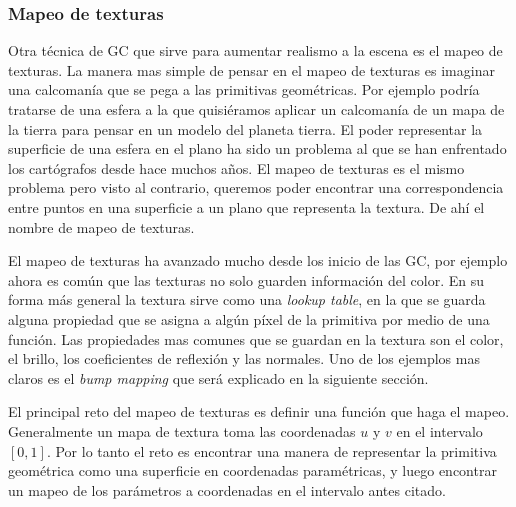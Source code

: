 \subsubsection{Mapeo de texturas}

Otra técnica de GC que sirve para aumentar realismo a la escena es el mapeo de texturas. La manera mas simple de pensar en el mapeo de texturas es imaginar una calcomanía que se pega a las primitivas geométricas. Por ejemplo podría tratarse de una esfera a la que quisiéramos aplicar un calcomanía de un mapa de la tierra para pensar en un modelo del planeta tierra. El poder representar la superficie de una esfera en el plano ha sido un problema al que se han enfrentado los cartógrafos desde hace muchos años. El mapeo de texturas es el mismo problema pero visto al contrario, queremos poder encontrar una correspondencia entre puntos en una superficie a un plano que representa la textura. De ahí el nombre de mapeo de texturas.

El mapeo de texturas ha avanzado mucho desde los inicio de las GC, por ejemplo ahora es común que las texturas no solo guarden información del color. En su forma más general la textura sirve como una \emph{lookup table}, en la que se guarda alguna propiedad que se asigna a algún píxel de la primitiva por medio de una función. Las propiedades mas comunes que se guardan en la textura son el color, el brillo, los coeficientes de reflexión y las normales. Uno de los ejemplos mas claros es el \emph{bump mapping} que será explicado en la siguiente sección.

El principal reto del mapeo de texturas es definir una función que haga el mapeo. Generalmente un mapa de textura toma las coordenadas $u$ y $v$ en el intervalo $[0, 1]$. Por lo tanto el reto es encontrar una manera de representar la primitiva geométrica como una superficie en coordenadas paramétricas, y luego encontrar un mapeo de los parámetros a coordenadas en el intervalo antes citado.

